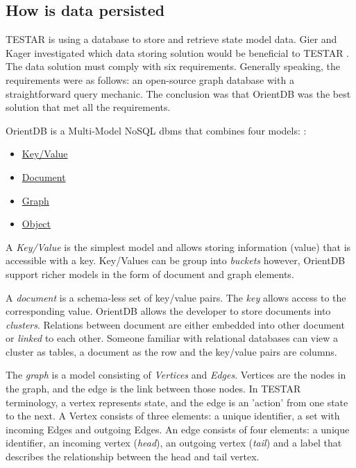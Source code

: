     



\subsection{How is data persisted}

    TESTAR is using a database to store and retrieve state model data. Gier and Kager investigated which data storing solution would be beneficial to TESTAR \cite{GierKager}. The data solution must comply with six requirements. Generally speaking, the requirements were as follows: an open-source graph database with a straightforward query mechanic. The conclusion was that OrientDB was the best solution that met all the requirements. 
    
    OrientDB is a Multi-Model NoSQL \acrfull{dbms} that combines four models: \cite{orientDbModeling}:
   \begin{samepage}
        \begin{itemize}
            \item \hyperlink{db:key-value}{Key/Value}
            \item \hyperlink{db:document}{Document}
            \item \hyperlink{db:graph}{Graph}
            \item \hyperlink{db:object}{Object}
        \end{itemize}
    \end{samepage}

    A \hypertarget{db:key-value}{\emph{Key/Value}} is the simplest model and allows storing information (value) that is accessible with a key. Key/Values can be group into \textit{buckets} however, OrientDB support richer models in the form of document and graph elements. 

    A \hypertarget{db:document}{\emph{document}} is a schema-less set of key/value pairs. The \emph{key} allows access to the corresponding value. OrientDB allows the developer to store documents into \emph{clusters}. Relations between document are either embedded into other document or \emph{linked} to each other. Someone familiar with relational databases can view a cluster as tables, a document as the row and the key/value pairs are columns. 
    
    The \hypertarget{db:graph}{\emph{graph}} is a model consisting of \emph{Vertices} and \emph{Edges}. Vertices are the nodes in the graph, and the edge is the link between those nodes. In TESTAR terminology, a vertex represents state, and the edge is an 'action' from one state to the next. A Vertex consists of three elements: a unique identifier, a set with incoming Edges and outgoing Edges. An edge consists of four elements: a unique identifier, an incoming vertex (\emph{head}), an outgoing vertex (\emph{tail}) and a label that describes the relationship between the head and tail vertex. 

